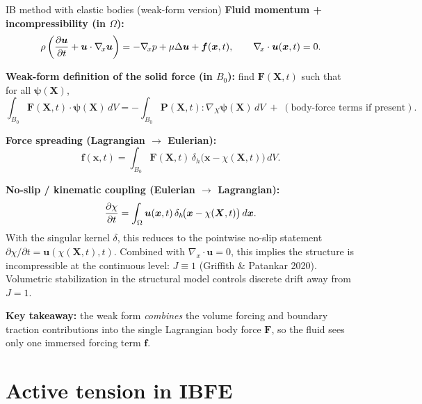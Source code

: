 \documentclass[aspectratio=169]{beamer}
\newcommand{\x}{\bm{x}}
\newcommand{\X}{\bm{X}}
\newcommand{\gradX}{\nabla_{\!X}}
\newcommand{\divx}{\nabla_{\!x}\!\cdot}
\newcommand{\Pten}{\bm{P}}        %
\newcommand{\FLag}{\bm{F}}       %
\newcommand{\fEuler}{\bm{f}}     %
\newcommand{\uEuler}{\bm{u}}     %
\newcommand{\deltah}{\delta_h}   %
\begin{document}
\begin{frame}{IB method with elastic bodies (weak-form version)}
\footnotesize
\textbf{Fluid momentum + incompressibility (in \(\Omega\)):}
\[
\rho\left(\pdv{\uEuler}{t}+\uEuler\cdot\nabla_{\!x}\uEuler\right)
= -\nabla_{\!x}p + \mu \Delta \uEuler + \fEuler(\x,t),
\qquad
\nabla_{\!x}\cdot\uEuler(\x,t)=0.
\]

\medskip
\textbf{Weak-form definition of the solid force (in \(B_0\)):}\quad
find \(\FLag(\X,t)\) such that for all \(\bm{\psi}(\X)\),
\[
\int_{B_0} \FLag(\X,t)\cdot \bm{\psi}(\X)\,dV
=
-\int_{B_0} \Pten(\X,t):\gradX\bm{\psi}(\X)\,dV
\;+\;(\text{body-force terms if present}).
\]

\medskip
\textbf{Force spreading (Lagrangian \(\to\) Eulerian):}
\[
\fEuler(\x,t)=\int_{B_0}\FLag(\X,t)\,\deltah\!\big(\x-\chi(\X,t)\big)\,dV.
\]

\medskip
\textbf{No-slip / kinematic coupling (Eulerian \(\to\) Lagrangian):}
\[
\pdv{\chi}{t}(\X,t)=\int_{\Omega}\uEuler(\x,t)\,\deltah\!\big(\x-\chi(\X,t)\big)\,d\x.
\]
\scriptsize With the singular kernel \(\delta\), this reduces to the pointwise no-slip statement \(\partial \chi/\partial t = \uEuler(\chi(\X,t),t)\). Combined with \(\divx\uEuler=0\), this implies the structure is incompressible at the continuous level: \(J\equiv 1\) (Griffith \& Patankar 2020). Volumetric stabilization in the structural model controls discrete drift away from \(J=1\).

\medskip
\small
\textbf{Key takeaway:}
the weak form \emph{combines} the volume forcing and boundary traction contributions into the single Lagrangian body force \(\FLag\),
so the fluid sees only one immersed forcing term \(\fEuler\).
\end{frame}









\section{Active tension in IBFE}
\end{document}
